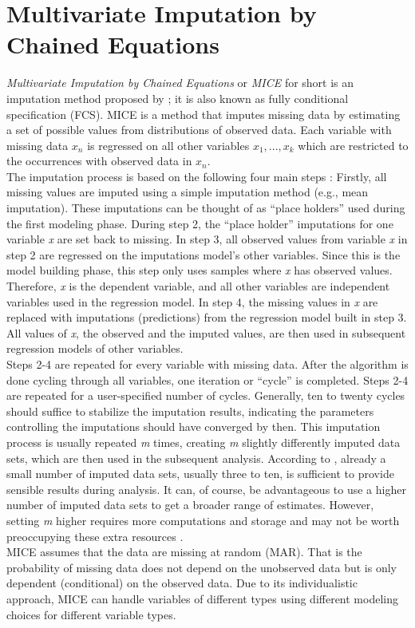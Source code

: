 \section{Multivariate Imputation by Chained Equations}
\textit{Multivariate Imputation by Chained Equations} or \textit{MICE} for 
short is an imputation method proposed by \citeauthor{RN135} \cite{RN135}; it 
is also known as fully conditional specification (FCS).
MICE is a method that imputes missing data by estimating a set of possible 
values from distributions of observed data. Each variable with missing data 
$x_n$ is regressed on all other variables $x_1, ..., x_k$ which are restricted 
to the occurrences with observed data in $x_n$.
\\
The imputation process is based on the following four main steps \cite{RN142, 
RN141}: Firstly, all missing values are imputed using a simple imputation 
method (e.g., mean imputation). These imputations can be thought of as ``place 
holders'' used during the first modeling phase. During step 2, the ``place 
holder'' imputations for one variable \textit{x} are set back to missing. In 
step 3, all observed values from variable \textit{x} in step 2 are regressed on 
the imputations model's other variables. Since this is the model building 
phase, this step only uses samples where \textit{x} has observed values. 
Therefore, \textit{x} is the dependent variable, and all other variables are 
independent variables used in the regression model. In step 4, the missing 
values in \textit{x} are replaced with imputations (predictions) from the 
regression model built in step 3. All values of \textit{x}, the observed and the 
imputed values, are then used in subsequent regression models of other 
variables.
\\
Steps 2-4 are repeated for every variable with missing data. After the 
algorithm is done cycling through all variables, one iteration or ``cycle'' is 
completed. Steps 2-4 are repeated for a user-specified number of cycles. 
Generally, ten to twenty cycles should suffice to stabilize the imputation 
results, indicating the parameters controlling the imputations should have 
converged by then. This imputation process is usually repeated \textit{m} 
times, creating \textit{m} slightly differently imputed data sets, which are 
then used in the subsequent analysis. According to \cite{RN144, RN141, RN142}, 
already a 
small number of imputed data sets, usually three to ten, is sufficient to 
provide sensible results during analysis. It can, of course, be advantageous 
to use a higher number of imputed data sets to get a broader range of 
estimates. However, setting \textit{m} higher requires more computations and 
storage 
and may not be worth preoccupying these extra resources \cite{RN144}.
\\
MICE assumes that the data are missing at random (MAR). That is the probability 
of missing data does not depend on the unobserved data but is only 
dependent (conditional) on the observed data. Due to its individualistic 
approach, MICE can handle variables of different types using different 
modeling choices for different variable types.
